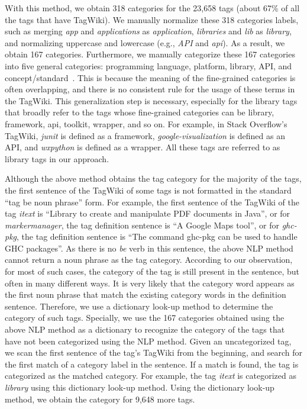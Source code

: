 With this method, we obtain 318 categories for the 23,658 tags (about 67\% of all the tags that have TagWiki).
We manually normalize these 318 categories labels, such as merging \textit{app} and \textit{applications} as \textit{application}, \textit{libraries} and \textit{lib} as \textit{library}, and normalizing uppercase and lowercase (e.g., \textit{API} and \textit{api}).
As a result, we obtain 167 categories.
Furthermore, we manually categorize these 167 categories into five general categories: programming language, platform, library, API, and concept/standard~\cite{ye2016software}.
This is because the meaning of the fine-grained categories is often overlapping, and there is no consistent rule for the usage of these terms in the TagWiki.
This generalization step is necessary, especially for the library tags that broadly refer to the tags whose fine-grained categories can be library, framework, api, toolkit, wrapper, and so on.
For example, in Stack Overflow's TagWiki, \textit{junit} is defined as a framework, \textit{google-visualization} is defined as an API, and \textit{wxpython} is defined as a wrapper. 
All these tags are referred to as library tags in our approach.


Although the above method obtains the tag category for the majority of the tags, the first sentence of the TagWiki of some tags is not formatted in the standard ``tag be noun phrase'' form.
For example, the first sentence of the TagWiki of the tag \textit{itext} is ``Library to create and manipulate PDF documents in Java'', or for \textit{markermanager}, the tag definition sentence is ``A Google Maps tool'', or for \textit{ghc-pkg}, the tag definition sentence is ``The command ghc-pkg can be used to handle GHC packages''.
As there is no \textit{be} verb in this sentence, the above NLP method cannot return a noun phrase as the tag category.
According to our observation, for most of such cases, the category of the tag is still present in the sentence, but often in many different ways.
It is very likely that the category word appears as the first noun phrase that match the existing category words in the definition sentence.
Therefore, we use a dictionary look-up method to determine the category of such tags.
Specially, we use the 167 categories obtained using the above NLP method as a dictionary to recognize the category of the tags that have not been categorized using the NLP method.
Given an uncategorized tag, we scan the first sentence of the tag's TagWiki from the beginning, and search for the first match of a category label in the sentence.
If a match is found, the tag is categorized as the matched category.
For example, the tag \textit{itext} is categorized as \textit{library} using this dictionary look-up method.
Using the dictionary look-up method, we obtain the category for 9,648 more tags.

